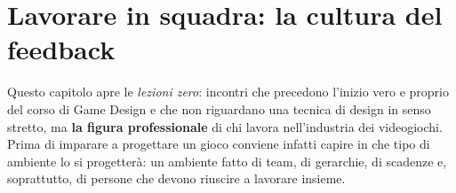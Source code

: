 %
%
%    
%    
%

\chapter[La cultura del feedback]{Lavorare in squadra: la cultura del feedback}
\label{cap:z1-feedback}

Questo capitolo apre le \emph{lezioni zero}: incontri che precedono l'inizio
vero e proprio del corso di Game Design e che non riguardano una tecnica di
design in senso stretto, ma \textbf{la figura professionale} di chi lavora
nell'industria dei videogiochi. Prima di imparare a progettare un gioco
conviene infatti capire in che tipo di ambiente lo si progetterà: un ambiente
fatto di team, di gerarchie, di scadenze e, soprattutto, di persone che devono
riuscire a lavorare insieme.

